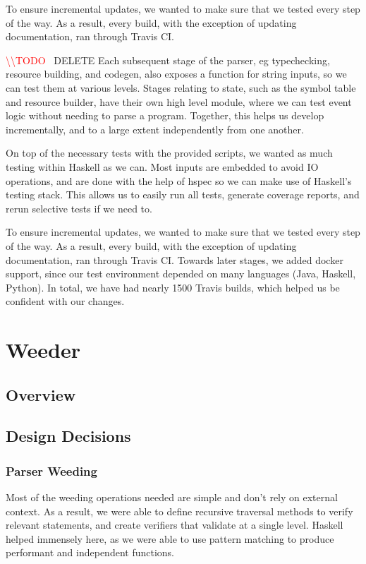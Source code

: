\documentclass[11pt]{article}
\newcommand{\todo}[0]{\textcolor{red}{\textbackslash\textbackslash TODO \ }}
\begin{document}
To ensure incremental updates, we wanted to make sure that we tested every step of the way. As a result, every build, with the exception of updating documentation, ran through Travis CI.

\todo DELETE
Each subsequent stage of the parser, eg typechecking, resource building, and codegen, also exposes a function for string inputs, so we can test them at various levels.
Stages relating to state, such as the symbol table and resource builder,
have their own high level module, where we can test event logic without
needing to parse a program. Together, this helps us develop incrementally,
and to a large extent independently from one another.

On top of the necessary tests with the provided scripts, we wanted as much
testing within Haskell as we can. Most inputs are embedded to avoid IO operations, and are done with the help of hspec so we can make use of Haskell's testing stack. This allows us to easily run all tests,
generate coverage reports, and rerun selective tests if we need to.

To ensure incremental updates, we wanted to make sure that we tested every step of the way. As a result, every build, with the exception of updating documentation, ran through Travis CI.
Towards later stages, we added docker support, since our test environment depended on many languages (Java, Haskell, Python).
In total, we have had nearly 1500 Travis builds, which helped us be confident with our changes.

\section{Weeder}
\subsection{Overview} %
\subsection{Design Decisions}
\subsubsection{Parser Weeding}
Most of the weeding operations needed are simple and don't rely on
external context. As a result, we were able to define recursive
traversal methods to verify relevant statements, and create verifiers
that validate at a single level. Haskell helped immensely here, as we
were able to use pattern matching to produce performant and
independent functions.
\end{document}
